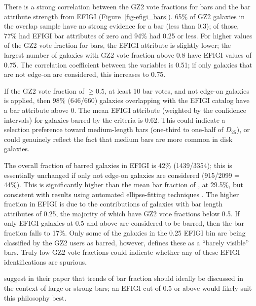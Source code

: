 \documentclass[useAMS,usenatbib]{mn2e}
\begin{document}
There is a strong correlation between the GZ2 vote fractions for bars and the bar attribute strength from EFIGI (Figure~\ref{fig-efigi_bars}). 65\% of GZ2 galaxies in the overlap sample have no strong evidence for a bar (less than 0.3); of those, 77\% had EFIGI bar attributes of zero and 94\% had 0.25 or less. For higher values of the GZ2 vote fraction for bars, the EFIGI attribute is slightly lower; the largest number of galaxies with GZ2 vote fraction above 0.8 have EFIGI values of 0.75. The correlation coefficient between the variables is 0.51; if only galaxies that are not edge-on are considered, this increases to 0.75. 

If the \citet{mas11c} GZ2 vote fraction of $\geq0.5$, at least 10 bar votes, and not edge-on galaxies is applied, then 98\% (646/660) galaxies overlapping with the EFIGI catalog have a bar attribute above 0. The mean EFIGI attribute (weighted by the confidence intervals) for galaxies barred by the \citet{mas11c} criteria is 0.62. This could indicate a selection preference toward medium-length bars (one-third to one-half of $D_{25}$), or could genuinely reflect the fact that medium bars are more common in disk galaxies. 

The overall fraction of barred galaxies in EFIGI is 42\% (1439/3354); this is essentially unchanged if only not edge-on galaxies are considered (915/2099 = 44\%). This is significantly higher than the mean bar fraction of \citet{mas11c}, at 29.5\%, but consistent with results using automated ellipse-fitting techniques \citep{bar08,agu09}. The higher fraction in EFIGI is due to the contributions of galaxies with bar length attributes of 0.25, the majority of which have GZ2 vote fractions below 0.5. If only EFIGI galaxies at 0.5 and above are considered to be barred, then the bar fraction falls to 17\%. Only some of the galaxies in the 0.25 EFIGI bin are being classified by the GZ2 users as barred, however, \citet{bai11} defines these as a ``barely visible'' bars. Truly low GZ2 vote fractions could indicate whether any of these EFIGI identifications are spurious.

\citet{mas11c} suggest in their paper that trends of bar fraction should ideally be discussed in the context of large or strong bars; an EFIGI cut of 0.5 or above would likely suit this philosophy best. 

\end{document}
